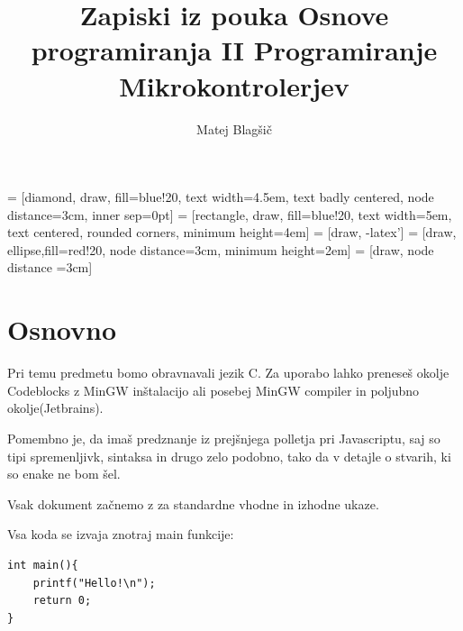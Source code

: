 \documentclass[a4paper, 12pt]{article}
\title{Zapiski iz pouka Osnove programiranja II Programiranje Mikrokontrolerjev}
\author{Matej Blagšič}
\begin{document}
 = [diamond, draw, fill=blue!20, 
text width=4.5em, text badly centered, node distance=3cm, inner sep=0pt]
 = [rectangle, draw, fill=blue!20, 
text width=5em, text centered, rounded corners, minimum height=4em]
 = [draw, -latex']
 = [draw, ellipse,fill=red!20, node distance=3cm,
minimum height=2em]
 = [draw, node distance =3cm]

\newcommand{\harpoon}{\overset{\rightharpoonup}}


\maketitle
\thispagestyle{empty}
\pagebreak
\setcounter{page}{1}

\tableofcontents
\pagebreak



\section{Osnovno}

Pri temu predmetu bomo obravnavali jezik C. Za uporabo lahko preneseš okolje Codeblocks z MinGW inštalacijo ali posebej MinGW compiler in poljubno okolje(Jetbrains).\

Pomembno je, da imaš predznanje iz prejšnjega polletja pri Javascriptu, saj so tipi spremenljivk, sintaksa in drugo zelo podobno, tako da v detajle o stvarih, ki so enake ne bom šel.

Vsak dokument začnemo z  za standardne vhodne in izhodne ukaze.

Vsa koda se izvaja znotraj main funkcije:

\begin{lstlisting}
int main(){
    printf("Hello!\n");
    return 0;
}
\end{lstlisting}
\end{document}
